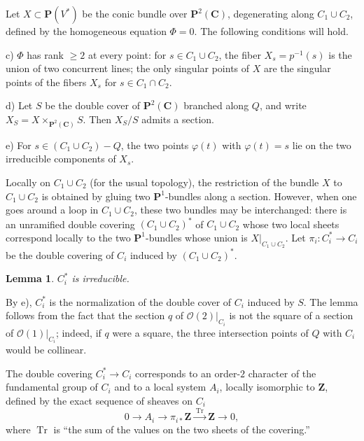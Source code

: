 \documentclass[12pt]{amsart}
\theoremstyle{plain}
\newtheorem{lemma}[theorem]{Lemma}
\theoremstyle{definition}
\theoremstyle{remark}
\DeclareMathOperator{\Tr}{Tr}
\begin{document}
Let $X\subset \mathbf P(V^*)$ be the conic bundle over $\mathbf P^2(\mathbf C)$,
degenerating along $C_1\cup C_2$, defined by the homogeneous equation
$\Phi=0$. The following conditions will hold.

\medskip
\noindent c) $\Phi$ has rank $\geqslant 2$ at every point: for $s\in C_1\cup C_2$,
the fiber $X_s=p^{-1}(s)$ is the union of two concurrent lines; the only singular
points of $X$ are the singular points of the fibers $X_s$ for $s\in C_1\cap C_2$.

\medskip
\noindent d) Let $S$ be the double cover of $\mathbf P^2(\mathbf C)$ branched along
$Q$, and write
$X_S=X\times_{\mathbf P^2(\mathbf C)}S$. Then $X_S/S$ admits a section.

\medskip
\noindent e) For $s\in (C_1\cup C_2)-Q$, the two points $\varphi(t)$ with
$\varphi(t)=s$ lie on the two irreducible components of $X_s$.

\medskip
Locally on $C_1\cup C_2$ (for the usual topology), the restriction of the bundle $X$
to $C_1\cup C_2$ is obtained by gluing two $\mathbf P^1$-bundles along a section.
However, when one goes around a loop in $C_1\cup C_2$, these two bundles may be
interchanged: there is an unramified double covering $(C_1\cup C_2)^*$ of
$C_1\cup C_2$ whose two local sheets correspond locally to the two
$\mathbf P^1$-bundles whose union is $X|_{C_1\cup C_2}$. Let
$\pi_i\colon C_i^*\to C_i$ be the double covering of $C_i$ induced by
$(C_1\cup C_2)^*$.

\begin{lemma}\label{lem:3.1}
$C_i^*$ is irreducible.
\end{lemma}

By e), $C_i^*$ is the normalization of the double cover of $C_i$ induced by $S$.
The lemma follows from the fact that the section $q$ of $\mathcal O(2)|_{C_i}$ is
not the square of a section of $\mathcal O(1)|_{C_i}$; indeed, if $q$ were a square,
the three intersection points of $Q$ with $C_i$ would be collinear.

\medskip
The double covering $C_i^*\to C_i$ corresponds to an order-$2$ character of the
fundamental group of $C_i$ and to a local system $A_i$, locally isomorphic to
$\mathbf Z$, defined by the exact sequence of sheaves on $C_i$
\begin{equation}\label{eq:3.2}
0\longrightarrow A_i\longrightarrow \pi_{i*}\mathbf Z\xrightarrow{\;\Tr\;}\mathbf Z\longrightarrow 0,
\end{equation}
where $\Tr$ is ``the sum of the values on the two sheets of the covering.''
\end{document}

